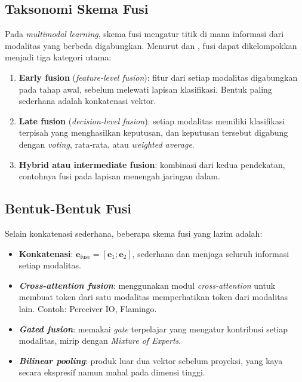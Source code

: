 \subsection{Taksonomi Skema Fusi}

Pada \textit{multimodal learning}, skema fusi mengatur titik di mana informasi dari modalitas yang berbeda digabungkan. Menurut \citet{baltrusaitisMultimodalSurvey2019} dan \citet{ramachandramMultimodalDL2017}, fusi dapat dikelompokkan menjadi tiga kategori utama:

\begin{enumerate}
    \item \textbf{Early fusion} (\textit{feature-level fusion}): fitur dari setiap modalitas digabungkan pada tahap awal, sebelum melewati lapisan klasifikasi. Bentuk paling sederhana adalah konkatenasi vektor.
    \item \textbf{Late fusion} (\textit{decision-level fusion}): setiap modalitas memiliki klasifikasi terpisah yang menghasilkan keputusan, dan keputusan tersebut digabung dengan \textit{voting}, rata-rata, atau \textit{weighted average}.
    \item \textbf{Hybrid atau intermediate fusion}: kombinasi dari kedua pendekatan, contohnya fusi pada lapisan menengah jaringan dalam.
\end{enumerate}

\subsection{Bentuk-Bentuk Fusi}

Selain konkatenasi sederhana, beberapa skema fusi yang lazim adalah:

\begin{itemize}
    \item \textbf{Konkatenasi}: $\mathbf{e}_{\text{fuse}} = [\mathbf{e}_1; \mathbf{e}_2]$, sederhana dan menjaga seluruh informasi setiap modalitas.
    \item \textbf{\textit{Cross-attention fusion}}: menggunakan modul \textit{cross-attention} untuk membuat token dari satu modalitas memperhatikan token dari modalitas lain. Contoh: Perceiver IO, Flamingo.
    \item \textbf{\textit{Gated fusion}}: memakai \textit{gate} terpelajar yang mengatur kontribusi setiap modalitas, mirip dengan \textit{Mixture of Experts}.
    \item \textbf{\textit{Bilinear pooling}}: produk luar dua vektor sebelum proyeksi, yang kaya secara ekspresif namun mahal pada dimensi tinggi.
\end{itemize}

